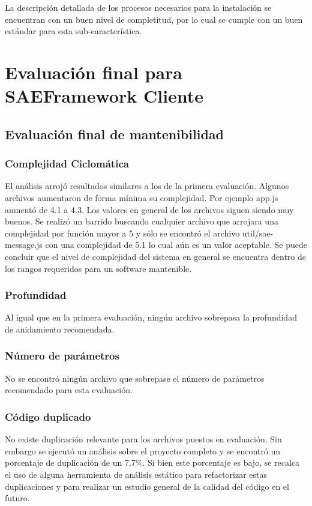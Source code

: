 La descripción detallada de los procesos necesarios para la instalación 
se encuentran con un buen nivel de completitud, por lo cual se cumple con un 
buen estándar para esta sub-característica.

\section{Evaluación final para SAEFramework Cliente}
\subsection{Evaluación final de mantenibilidad}
\subsubsection{Complejidad Ciclomática}
El análisis arrojó resultados similares a los de la primera evaluación. Algunos archivos aumentaron
de forma mínima su complejidad. Por ejemplo app.js aumentó de 4.1 a 4.3.
Los valores en general de los archivos siguen siendo muy buenos.
Se realizó un barrido buscando cualquier archivo que arrojara una complejidad por función mayor
a 5 y sólo se encontró el archivo util/sae-message.js con una complejidad de 5.1 lo cual aún es
un valor aceptable.
Se puede concluir que el nivel de complejidad del sistema en general se encuentra dentro
de los rangos requeridos para un software mantenible.
\subsubsection{Profundidad}
Al igual que en la primera evaluación, ningún archivo sobrepasa la profundidad de anidamiento
recomendada.
\subsubsection{Número de parámetros}
No se encontró ningún archivo que sobrepase el número de parámetros recomendado para
esta evaluación.
\subsubsection{Código duplicado}
No existe duplicación relevante para los archivos puestos en evaluación. Sin embargo se ejecutó
un análisis sobre el proyecto completo y se encontró un porcentaje de duplicación de un 7.7\%.
Si bien este porcentaje es bajo, se recalca el uso de alguna herramienta de análisis estático para
refactorizar estas duplicaciones y para realizar un estudio general de la calidad del código en el futuro.
